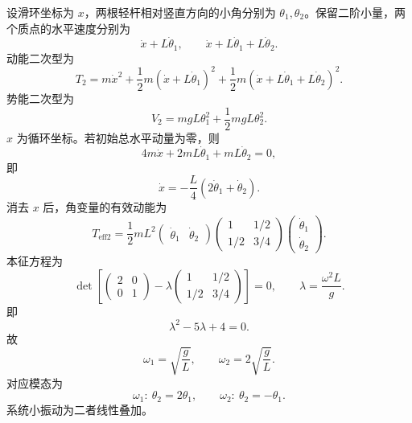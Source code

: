 \begin{question}[滑环上二连杆系统的小振动]
\begin{solution}
设滑环坐标为 $x$，两根轻杆相对竖直方向的小角分别为 $\theta_1,\theta_2$。保留二阶小量，两个质点的水平速度分别为
\[
  \dot x+L\dot\theta_1,
  \qquad
  \dot x+L\dot\theta_1+L\dot\theta_2.
\]
动能二次型为
\[
  T_2=m\dot x^2+\frac12m(\dot x+L\dot\theta_1)^2
  +\frac12m(\dot x+L\dot\theta_1+L\dot\theta_2)^2.
\]
势能二次型为
\[
  V_2=mgL\theta_1^2+\frac12mgL\theta_2^2.
\]
$x$ 为循环坐标。若初始总水平动量为零，则
\[
  4m\dot x+2mL\dot\theta_1+mL\dot\theta_2=0,
\]
即
\[
  \dot x=-\frac L4(2\dot\theta_1+\dot\theta_2).
\]
消去 $x$ 后，角变量的有效动能为
\[
  T_{\mathrm{eff}2}=\frac12mL^2
  \begin{pmatrix}\dot\theta_1&\dot\theta_2\end{pmatrix}
  \begin{pmatrix}1&1/2\\1/2&3/4\end{pmatrix}
  \begin{pmatrix}\dot\theta_1\\\dot\theta_2\end{pmatrix}.
\]
本征方程为
\[
  \det\left[
  \begin{pmatrix}2&0\\0&1\end{pmatrix}
  -\lambda\begin{pmatrix}1&1/2\\1/2&3/4\end{pmatrix}
  \right]=0,
  \qquad
  \lambda=\frac{\omega^2L}{g}.
\]
即
\[
  \lambda^2-5\lambda+4=0.
\]
故
\[
  \boxed{\omega_1=\sqrt{\frac gL}},
  \qquad
  \boxed{\omega_2=2\sqrt{\frac gL}}.
\]
对应模态为
\[
  \omega_1:\ \theta_2=2\theta_1,
  \qquad
  \omega_2:\ \theta_2=-\theta_1.
\]
系统小振动为二者线性叠加。
\end{solution}
\end{question}

